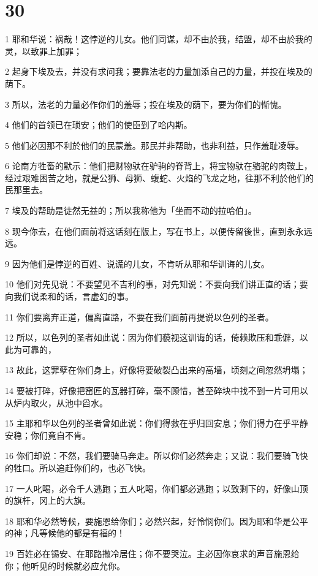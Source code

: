 \chapter{30}

\par 1 耶和华说：祸哉！这悖逆的儿女。他们同谋，却不由於我，结盟，却不由於我的灵，以致罪上加罪；
\par 2 起身下埃及去，并没有求问我；要靠法老的力量加添自己的力量，并投在埃及的荫下。
\par 3 所以，法老的力量必作你们的羞辱；投在埃及的荫下，要为你们的惭愧。
\par 4 他们的首领已在琐安；他们的使臣到了哈内斯。
\par 5 他们必因那不利於他们的民蒙羞。那民并非帮助，也非利益，只作羞耻凌辱。
\par 6 论南方牲畜的默示：他们把财物驮在驴驹的脊背上，将宝物驮在骆驼的肉鞍上，经过艰难困苦之地，就是公狮、母狮、蝮蛇、火焰的飞龙之地，往那不利於他们的民那里去。
\par 7 埃及的帮助是徒然无益的；所以我称他为「坐而不动的拉哈伯」。
\par 8 现今你去，在他们面前将这话刻在版上，写在书上，以便传留後世，直到永永远远。
\par 9 因为他们是悖逆的百姓、说谎的儿女，不肯听从耶和华训诲的儿女。
\par 10 他们对先见说：不要望见不吉利的事，对先知说：不要向我们讲正直的话；要向我们说柔和的话，言虚幻的事。
\par 11 你们要离弃正道，偏离直路，不要在我们面前再提说以色列的圣者。
\par 12 所以，以色列的圣者如此说：因为你们藐视这训诲的话，倚赖欺压和乖僻，以此为可靠的，
\par 13 故此，这罪孽在你们身上，好像将要破裂凸出来的高墙，顷刻之间忽然坍塌；
\par 14 要被打碎，好像把窑匠的瓦器打碎，毫不顾惜，甚至碎块中找不到一片可用以从炉内取火，从池中舀水。
\par 15 主耶和华以色列的圣者曾如此说：你们得救在乎归回安息；你们得力在乎平静安稳；你们竟自不肯。
\par 16 你们却说：不然，我们要骑马奔走。所以你们必然奔走；又说：我们要骑飞快的牲口。所以追赶你们的，也必飞快。
\par 17 一人叱喝，必令千人逃跑；五人叱喝，你们都必逃跑；以致剩下的，好像山顶的旗杆，冈上的大旗。
\par 18 耶和华必然等候，要施恩给你们；必然兴起，好怜悯你们。因为耶和华是公平的神；凡等候他的都是有福的！
\par 19 百姓必在锡安、在耶路撒冷居住；你不要哭泣。主必因你哀求的声音施恩给你；他听见的时候就必应允你。
